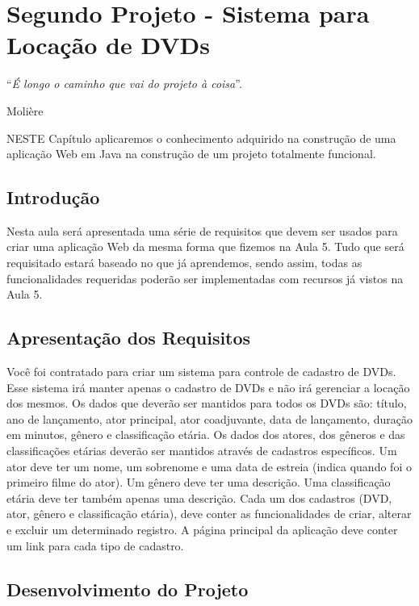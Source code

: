 \chapter{Segundo Projeto - Sistema para Locação de DVDs}
\epigraph{``\textit{É longo o caminho que vai do projeto à coisa}''.}{Molière}

\lettrine[lines=4, lhang=0.1, lraise=0, loversize=0.2, findent=0.1em]{\textcolor{corAzulTema}{N}}{ESTE} Capítulo aplicaremos o conhecimento adquirido na construção de uma aplicação Web em Java na construção de um projeto totalmente funcional.


\section{Introdução}

Nesta aula será apresentada uma série de requisitos que devem ser usados para criar uma aplicação Web da mesma forma que fizemos na Aula 5. Tudo que será requisitado estará baseado no que já aprendemos, sendo assim, todas as funcionalidades requeridas poderão ser implementadas com recursos já vistos na Aula 5.


\section{Apresentação dos Requisitos}

Você foi contratado para criar um sistema para controle de cadastro de DVDs. Esse sistema irá manter apenas o cadastro de DVDs e não irá gerenciar a locação dos mesmos. Os dados que deverão ser mantidos para todos os DVDs são: título, ano de lançamento, ator principal, ator coadjuvante, data de lançamento, duração em minutos, gênero e classificação etária. Os dados dos atores, dos gêneros e das classificações etárias deverão ser mantidos através de cadastros específicos. Um ator deve ter um nome, um sobrenome e uma data de estreia (indica quando foi o primeiro filme do ator). Um gênero deve ter uma descrição. Uma classificação etária deve ter também apenas uma descrição. Cada um dos cadastros (DVD, ator, gênero e classificação etária), deve conter as funcionalidades de criar, alterar e excluir um determinado registro. A página principal da aplicação deve conter um link para cada tipo de cadastro.


\section{Desenvolvimento do Projeto}

